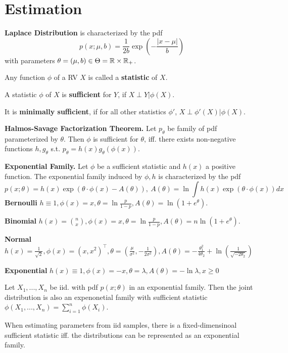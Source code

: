 \vspace*{-3mm}
\section{Estimation}
\textbf{Laplace Distribution} is characterized by the pdf
\[p(x; \mu, b) = \frac{1}{2b}\exp\left(-\frac{|x-\mu|}{b}\right)\]
with parameters \(\theta = (\mu, b) \in \Theta = \mathbb{R} \times \mathbb{R}_+\).

Any function \(\phi\) of a RV \(X\) is called a \textbf{statistic} of \(X\).

A statistic \(\phi\) of \(X\) is \textbf{sufficient} for \(Y\), if \(X \perp Y | \phi(X)\).

It is \textbf{minimally sufficient}, if for all other statistics \(\phi'\), \(X \perp \phi'(X) | \phi(X)\).

\textbf{Halmos-Savage Factorization Theorem.} Let \(p_\theta\) be family of pdf parameterized by \(\theta\). 
Then \(\phi\) is sufficient for \(\theta\), iff. there exists non-negative functions \(h, g_\theta\) s.t.
\(p_\theta = h(x)g_\theta(\phi(x))\).

\textbf{Exponential Family.} Let \(\phi\) be a sufficient statistic and \(h(x)\) a positive function. 
The exponential family induced by \(\phi, h\) is characterized by the pdf
\[p(x; \theta) = h(x)\exp(\theta\cdot\phi(x)-A(\theta)), \ A(\theta) = \ln \int h(x) \exp(\theta \cdot \phi(x))dx\]
\textbf{Bernoulli} \(h \equiv 1, \phi(x) = x, \theta = \ln \frac{p}{1-p}, A(\theta) = \ln(1+e^\theta)\).

\textbf{Binomial} \(h(x) = \binom{n}{x}, \phi(x) = x, \theta =  \ln \frac{p}{1-p}, A(\theta) = n \ln(1+e^\theta)\).

\textbf{Normal} \(h(x) = \frac{1}{\sqrt{2}}, \phi(x) = (x, x^2)^\top, \theta = \left(\frac{\mu}{\sigma^2}, -\frac{1}{2\sigma^2}\right), 
A(\theta) = -\frac{\theta_1^2}{4\theta_2} + \ln\left(\frac{1}{\sqrt{-2\theta_2}}\right)\)  


\textbf{Exponential} \(h(x) \equiv 1, \phi(x) = -x, \theta = \lambda, A(\theta) = - \ln \lambda, x \geq 0\)

Let \(X_1, ..., X_n\) be iid. with pdf \(p(x; \theta)\) in an exponential family. 
Then the joint distribution is also an expenonetial family 
with sufficient statistic \(\phi(X_1, ..., X_n) = \sum_{i = 1}^n \phi(X_i)\).

When estimating parameters from iid samples, there is a fixed-dimensinoal sufficient statistic 
iff. the distributions can be represented as an exponential family.

